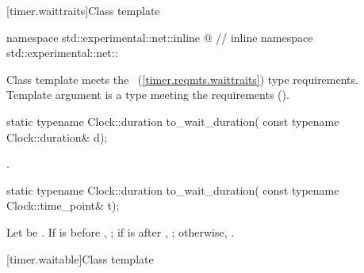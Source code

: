 [timer.waittraits]{Class template }

%
\begin{codeblock}
namespace std::experimental::net::inline @ // inline namespace std::experimental::net::\namespacever
\end{codeblock}

\pnum
Class template  meets the ~(\ref{timer.reqmts.waittraits}) type requirements. Template argument  is a type meeting the  requirements ().

%
\begin{itemdecl}
static typename Clock::duration to_wait_duration(
  const typename Clock::duration& d);
\end{itemdecl}

\begin{itemdescr}
\pnum
\returns {}.
\end{itemdescr}

%
\begin{itemdecl}
static typename Clock::duration to_wait_duration(
  const typename Clock::time_point& t);
\end{itemdecl}

\begin{itemdescr}
\pnum
\returns Let  be . If  is before , ; if  is after , ; otherwise, .
\end{itemdescr}


[timer.waitable]{Class template }

